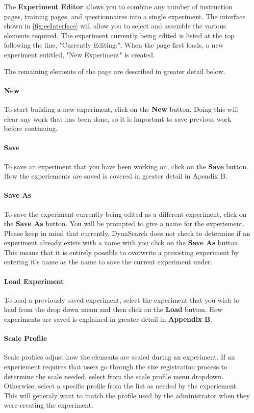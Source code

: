 \documentclass[article]{ij4uq}              %
\begin{document}
The \textbf{Experiment Editor} allows you to combine any number of instruction pages, training pages, and questionnaires into a single experiment. The interface shown in \ref{fig:eeInterface} will allow you to select and assemble the various elements required. The experiment currently being edited is listed at the top following the line, "Currently Editing:".  When the page first loads, a new experiment entitled, "New Experiment" is created.

The remaining elements of the page are described in greater detail below.

\paragraph{New}
To start building a new experiment, click on the \textbf{New} button. Doing this will clear any work that has been done, so it is important to save previous work before continuing.

\paragraph{Save}
To save an experiment that you have been working on, click on the \textbf{Save} button.  How the experiements are saved is covered in greater detail in Apendix B.

\paragraph{Save As}
To save the experiment currently being edited as a different experiment, click on the \textbf{Save As} button.  You will be prompted to give a name for the experiement.  Please keep in mind that currently, DynaSearch does not check to determine if an experiment already exists with a name with you click on the \textbf{Save As} button.  This means that it is entirely possible to overwrite a prexisting experiment by entering it's name as the name to save the current experiment under.

\paragraph{Load Experiment}
To load a previously saved experiment, select the experiment that you wish to load from the drop down menu and then click on the \textbf{Load} button.  How experiments are saved is explained in greater detail in \textbf{Appendix B}.

\paragraph{Scale Profile}
Scale profiles adjust how the elements are scaled during an experiment.  If an experiement requires that users go through the size registration process to determine the scale needed, select  from the scale profile menu dropdown.  Otherwise, select a specific profile from the list as needed by the experiement.  This will generaly want to match the profile used by the administrator when they were creating the experiment.
\end{document}
